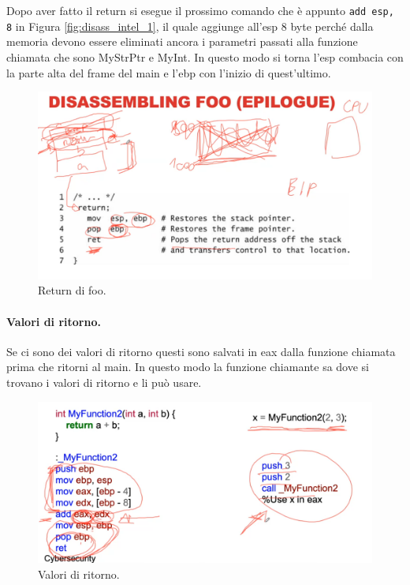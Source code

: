 Dopo aver fatto il return si esegue il prossimo comando che è appunto \verb|add esp, 8| in Figura \ref{fig:disass_intel_1}, il quale aggiunge all'esp 8 byte perché dalla memoria devono essere eliminati ancora i parametri passati alla funzione chiamata che sono MyStrPtr e MyInt. In questo modo si torna l'esp combacia con la parte alta del frame del main e l'ebp con l'inizio di quest'ultimo.
\begin{figure}[H]
	\centering
    \includegraphics[width=14cm, keepaspectratio]{santini/img/cap_2/disass_intel_3.png}
	\caption{Return di foo.}\label{fig:disass_intel_3}
\end{figure}

\paragraph{Valori di ritorno.} Se ci sono dei valori di ritorno questi sono salvati in eax dalla funzione chiamata prima che ritorni al main. In questo modo la funzione chiamante sa dove si trovano i valori di ritorno e li può usare. 
\begin{figure}[H]
	\centering
    \includegraphics[width=14cm, keepaspectratio]{santini/img/cap_2/return_values.png}
	\caption{Valori di ritorno.}\label{fig:ret_values}
\end{figure}

